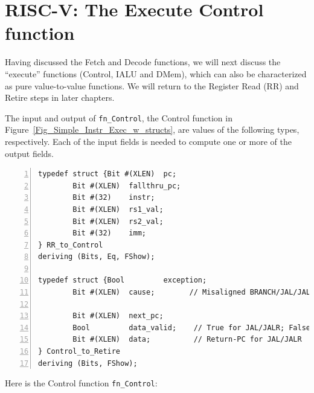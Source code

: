 \section{RISC-V: The Execute Control function}

\label{Sec_fn_Control}


Having discussed the Fetch and Decode functions, we will next discuss
the ``execute'' functions (Control, IALU and DMem), which can also be
characterized as pure value-to-value functions.  We will return to the
Register Read (RR) and Retire steps in later chapters.

The input and output of \verb|fn_Control|, the Control function in
Figure~\ref{Fig_Simple_Instr_Exec_w_structs}, are values of the
following types, respectively.  Each of the input fields is needed to
compute one or more of the output fields.

{\small
\begin{Verbatim}[frame=single, numbers=left]
typedef struct {Bit #(XLEN)  pc;
		Bit #(XLEN)  fallthru_pc;
		Bit #(32)    instr;
		Bit #(XLEN)  rs1_val;
		Bit #(XLEN)  rs2_val;
		Bit #(32)    imm;
} RR_to_Control
deriving (Bits, Eq, FShow);

typedef struct {Bool         exception;
		Bit #(XLEN)  cause;        // Misaligned BRANCH/JAL/JALR target

		Bit #(XLEN)  next_pc;
		Bool         data_valid;    // True for JAL/JALR; False for BRANCH
		Bit #(XLEN)  data;          // Return-PC for JAL/JALR
} Control_to_Retire
deriving (Bits, FShow);
\end{Verbatim}
}

Here is the Control function \verb|fn_Control|:

